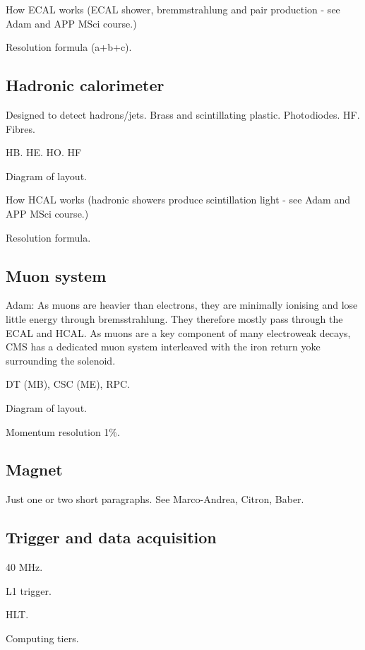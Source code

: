 How ECAL works (ECAL shower, bremmstrahlung and pair production - see Adam and 
APP MSci course.)

Resolution formula (a+b+c).

\subsection{Hadronic calorimeter}

Designed to detect hadrons/jets. Brass and scintillating plastic. Photodiodes. 
HF. Fibres.

HB. HE. HO. HF

Diagram of layout.

How HCAL works (hadronic showers produce scintillation light - see Adam and APP 
MSci course.)

Resolution formula.

\subsection{Muon system}

Adam: As muons are heavier than electrons, they are minimally ionising and lose 
little energy through bremsstrahlung. They therefore mostly pass through the 
ECAL and HCAL. As muons are a key component of many electroweak decays, CMS has 
a dedicated muon system interleaved with the iron return yoke surrounding the 
solenoid.
 
DT (MB), CSC (ME), RPC.

Diagram of layout.

Momentum resolution 1\%.

\subsection{Magnet}

Just one or two short paragraphs.
See Marco-Andrea, Citron, Baber.

\subsection{Trigger and data acquisition}


40 MHz.

L1 trigger.

HLT.

Computing tiers.

